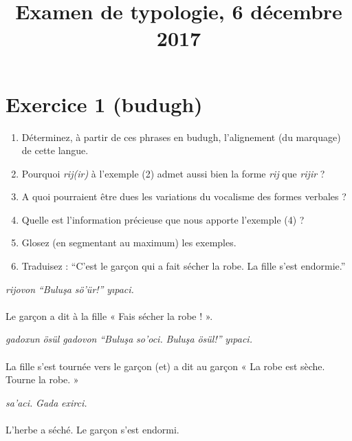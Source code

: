 \documentclass[oldfontcommands,twoside,a4paper,12pt]{article}
\newcommand{\ipa}[1]{{\phon\textit{#1}}}
\begin{document}
\title{Examen de typologie, 6 décembre 2017}
\maketitle
\section*{Exercice 1 (budugh)}

 \begin{enumerate}
  \item Déterminez, à partir de ces phrases en budugh, l'alignement (du marquage) de cette langue.
  \item Pourquoi \ipa{rij(ir)} à l'exemple (2) admet aussi bien la forme \ipa{rij} que \ipa{rijir} ?
  \item A quoi pourraient être dues les variations du vocalisme des formes verbales ?
  \item Quelle est l'information précieuse que nous apporte l'exemple (4) ?
  \item Glosez (en segmentant au maximum) les exemples.
  \item Traduisez : ``C’est le garçon qui a fait sécher la robe. La fille s’est endormie.''

\end{enumerate}

\vspace{0.5cm}

\begin{exe}
\ex
\gll \ipa{Gada’r} \ipa{rijovon} \ipa{``Buluşa} \ipa{ sö’ür!''} \ipa{yıpaci.}\\
\\
\glt Le garçon a dit à la fille « Fais sécher la robe ! ».
\end{exe}

\begin{exe}
\ex
\gll \ipa{Rij(ir)} \ipa{gadoxun} \ipa{ösül} \ipa{gadovon} \ipa{``Buluşa} \ipa{so’oci.} \ipa{Buluşa} \ipa{ ösül!''} \ipa{yıpaci.}\\
\\
\glt La fille s’est tournée vers le garçon (et) a dit au garçon « La robe est sèche. Tourne la robe. »
\end{exe}

\begin{exe}
\ex
\gll \ipa{Xhın} \ipa{sa’aci.} \ipa{Gada} \ipa{exirci.}\\
\\
\glt L’herbe a séché. Le garçon s’est endormi.
\end{exe}
\end{document}

